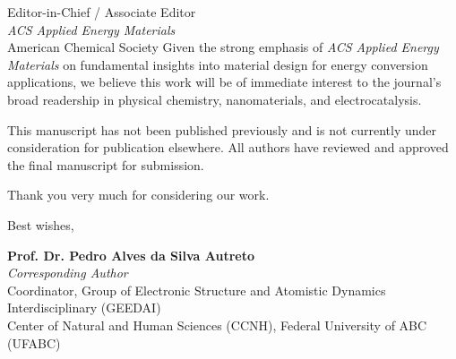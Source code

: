\documentclass[11pt,a4paper]{letter}
\begin{document}
\begin{letter}{
    Editor-in-Chief / Associate Editor\\
    \textit{ACS Applied Energy Materials}\\
    American Chemical Society
}
Given the strong emphasis of \textit{ACS Applied Energy Materials} on fundamental insights into material design for energy conversion applications, we believe this work will be of immediate interest to the journal's broad readership in physical chemistry, nanomaterials, and electrocatalysis.

This manuscript has not been published previously and is not currently under consideration for publication elsewhere. All authors have reviewed and approved the final manuscript for submission.

Thank you very much for considering our work.

\closing{Best wishes,}

\vspace{0.5cm}
\noindent
\textbf{Prof. Dr. Pedro Alves da Silva Autreto}\\
\textit{Corresponding Author}\\
Coordinator, Group of Electronic Structure and Atomistic Dynamics Interdisciplinary (GEEDAI)\\
Center of Natural and Human Sciences (CCNH), Federal University of ABC (UFABC)

\end{letter}
\end{document}

